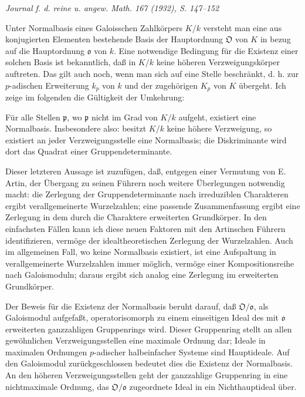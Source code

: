 \documentclass[11pt]{article}
\providecommand{\frako}{\mathfrak o}
\providecommand{\frakp}{\mathfrak p}
\providecommand{\frakO}{\mathfrak O}
\begin{document}
\begin{center}
\emph{Journal f. d. reine u. angew. Math. 167 (1932), S. 147--152}
\end{center}

Unter Normalbasis eines Galoisschen Zahlkörpers \(K/k\) versteht man eine aus konjugierten Elementen bestehende Basis der Hauptordnung \(\frakO\) von \(K\) in bezug auf die Hauptordnung \(\frako\) von \(k\). Eine notwendige Bedingung für die Existenz einer solchen Basis ist bekanntlich, daß in \(K/k\) keine höheren Verzweigungskörper auftreten. Das gilt auch noch, wenn man sich auf eine Stelle beschränkt, d. h. zur \(p\)-adischen Erweiterung \(k_p\) von \(k\) und der zugehörigen \(K_p\) von \(K\) übergeht. Ich zeige im folgenden die Gültigkeit der Umkehrung:

Für alle Stellen \(\frakp\), wo \(\frakp\) nicht im Grad von \(K/k\) aufgeht, existiert eine Normalbasis. Insbesondere also: besitzt \(K/k\) keine höhere Verzweigung, so existiert an jeder Verzweigungsstelle eine Normalbasis; die Diskriminante wird dort das Quadrat einer Gruppendeterminante.

Dieser letzteren Aussage ist zuzufügen, daß, entgegen einer Vermutung von E. Artin, der Übergang zu seinen Führern noch weitere Überlegungen notwendig macht: die Zerlegung der Gruppendeterminante nach irreduziblen Charakteren ergibt verallgemeinerte Wurzelzahlen; eine passende Zusammenfassung ergibt eine Zerlegung in dem durch die Charaktere erweiterten Grundkörper. In den einfachsten Fällen kann ich diese neuen Faktoren mit den Artinschen Führern identifizieren, vermöge der idealtheoretischen Zerlegung der Wurzelzahlen. Auch im allgemeinen Fall, wo keine Normalbasis existiert, ist eine Aufspaltung in verallgemeinerte Wurzelzahlen immer möglich, vermöge einer Kompositionsreihe nach Galoismoduln; daraus ergibt sich analog eine Zerlegung im erweiterten Grundkörper.

Der Beweis für die Existenz der Normalbasis beruht darauf, daß \(\frakO/\frako\), als Galoismodul aufgefaßt, operatorisomorph zu einem einseitigen Ideal des mit \(\frako\) erweiterten ganzzahligen Gruppenrings wird. Dieser Gruppenring stellt an allen gewöhnlichen Verzweigungsstellen eine maximale Ordnung dar; Ideale in maximalen Ordnungen \(p\)-adischer halbeinfacher Systeme sind Hauptideale. Auf den Galoismodul zurückgeschlossen bedeutet dies die Existenz der Normalbasis. An den höheren Verzweigungsstellen geht der ganzzahlige Gruppenring in eine nichtmaximale Ordnung, das \(\frakO/\frako\) zugeordnete Ideal in ein Nichthauptideal über.
\end{document}
